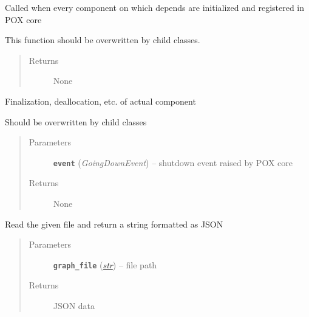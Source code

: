 \documentclass[letterpaper,10pt,english]{sphinxmanual}
\begin{document}
\begin{fulllineitems}
\begin{fulllineitems}
Called when every component on which depends are initialized and registered
in POX core

This function should be overwritten by child classes.
\begin{quote}\begin{description}
\item[{Returns}] \leavevmode
None

\end{description}\end{quote}

\end{fulllineitems}


\begin{fulllineitems}
\label{util/api:escape.util.api.AbstractAPI.shutdown}
Finalization, deallocation, etc. of actual component

Should be overwritten by child classes
\begin{quote}\begin{description}
\item[{Parameters}] \leavevmode
\textbf{\texttt{event}} (\emph{GoingDownEvent}) -- shutdown event raised by POX core

\item[{Returns}] \leavevmode
None

\end{description}\end{quote}

\end{fulllineitems}


\begin{fulllineitems}
\label{util/api:escape.util.api.AbstractAPI._read_json_from_file}
Read the given file and return a string formatted as JSON
\begin{quote}\begin{description}
\item[{Parameters}] \leavevmode
\textbf{\texttt{graph\_file}} (\href{https://docs.python.org/2.7/library/functions.html\#str}{\emph{str}}) -- file path

\item[{Returns}] \leavevmode
JSON data


\end{description}
\end{quote}
\end{fulllineitems}
\end{fulllineitems}
\end{document}
